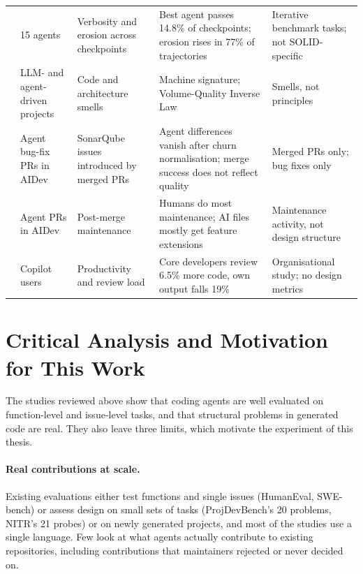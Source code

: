 \begin{landscape}
\begin{longtable}{@{}L{3.0cm}L{2.6cm}L{3.4cm}L{4.7cm}L{4.7cm}@{}}
\addlinespace
\citet{slopcodebench2026} & 15 agents & Verbosity and erosion across checkpoints & Best agent passes 14.8\% of checkpoints; erosion rises in 77\% of trajectories & Iterative benchmark tasks; not SOLID-specific \\
\addlinespace
\citet{zhu2026smells} & LLM- and agent-driven projects & Code and architecture smells & Machine signature; Volume-Quality Inverse Law & Smells, not principles \\
\addlinespace
\citet{cynthia2026postmerge} & Agent bug-fix PRs in AIDev & SonarQube issues introduced by merged PRs & Agent differences vanish after churn normalisation; merge success does not reflect quality & Merged PRs only; bug fixes only \\
\addlinespace
\citet{sawada2026maintenance} & Agent PRs in AIDev & Post-merge maintenance & Humans do most maintenance; AI files mostly get feature extensions & Maintenance activity, not design structure \\
\addlinespace
\citet{xu2025productivity} & Copilot users & Productivity and review load & Core developers review 6.5\% more code, own output falls 19\% & Organisational study; no design metrics \\
\end{longtable}
\normalsize
\end{landscape}

\section{Critical Analysis and Motivation for This Work}
\label{sec:gaps-contributions}

The studies reviewed above show that coding agents are well evaluated on function-level and
issue-level tasks, and that structural problems in generated code are real. They also leave three
limits, which motivate the experiment of this thesis.

\paragraph{Real contributions at scale.} Existing evaluations either test functions and single
issues (HumanEval, SWE-bench) or assess design on small sets of tasks (ProjDevBench's 20 problems,
NITR's 21 probes) or on newly generated projects, and most of the studies use a single language. Few
look at what agents actually contribute to existing repositories, including contributions that
maintainers rejected or never decided on.

